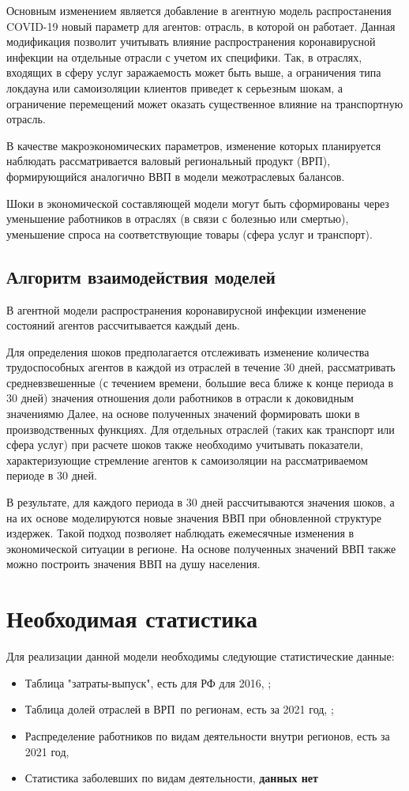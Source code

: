 \documentclass[12pt, a4paper]{article}
\begin{document}
Основным изменением является добавление в агентную модель распростанения COVID-19 новый параметр для агентов: отрасль, в которой он работает. Данная модификация позволит учитывать влияние распространения коронавирусной инфекции на отдельные отрасли с учетом их специфики. Так, в отраслях, входящих в сферу услуг заражаемость может быть выше, а ограничения типа локдауна или самоизоляции клиентов приведет к серьезным шокам, а ограничение перемещений может оказать существенное влияние на транспортную отрасль.

В качестве макроэкономических параметров, изменение которых планируется наблюдать рассматривается валовый региональный продукт (ВРП), формирующийся аналогично ВВП в модели межотраслевых балансов.

Шоки в экономической составляющей модели могут быть сформированы через уменьшение работников в отраслях (в связи с болезнью или смертью), уменьшение спроса на соответствующие товары (сфера услуг и транспорт).
\subsection{Алгоритм взаимодействия моделей}

В агентной модели распространения коронавирусной инфекции изменение состояний агентов рассчитывается каждый день.

Для определения шоков предполагается отслеживать изменение количества трудоспособных агентов в каждой из отраслей в течение 30 дней, рассматривать средневзвешенные (с течением времени, большие веса ближе к конце периода в 30 дней) значения отношения доли работников в отрасли к доковидным значениямю Далее, на основе полученных значений формировать шоки в производственных функциях. Для отдельных отраслей (таких как транспорт или сфера услуг) при расчете шоков также необходимо учитывать показатели, характеризующие стремление агентов к самоизоляции на рассматриваемом периоде в 30 дней.

В результате, для каждого периода в 30 дней рассчитываются значения шоков, а на их основе моделируются новые значения ВВП при обновленной структуре издержек. Такой подход позволяет наблюдать ежемесячные изменения в экономической ситуации в регионе. На основе полученных значений ВВП также можно построить значения ВВП на душу населения.
\section{Необходимая статистика}
Для реализации данной модели необходимы следующие статистические данные:
\begin{itemize}
\item Таблица "затраты-выпуск", есть для РФ для 2016, \cite{Rosstat_stat};
\item Таблица долей отраслей в ВРП\ по регионам, есть за 2021 год, \cite{Region_stat};
\item Распределение работников по видам деятельности внутри регионов, есть за 2021 год, \cite{Region_stat}
\item Статистика заболевших по видам деятельности, \textbf{данных нет}
\end{itemize}
\end{document}
